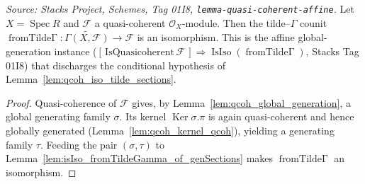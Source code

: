 \begin{lemma}
  \label{lem:isIso_fromTildeGamma_of_quasicoherent}
  \textit{Source: Stacks Project, Schemes, Tag 01I8,
  \texttt{lemma-quasi-coherent-affine}.}
  Let \(X = \operatorname{Spec} R\) and \(\mathcal{F}\) a quasi-coherent
  \(\mathcal{O}_X\)-module. Then the tilde--\(\Gamma\) counit
  \(\operatorname{fromTilde\Gamma} : \widetilde{\Gamma(X, \mathcal{F})} \to \mathcal{F}\)
  is an isomorphism. This is the affine global-generation instance
  (\([{\,}\mathrm{IsQuasicoherent}\,\mathcal{F}{\,}] \Rightarrow
  \operatorname{IsIso}(\operatorname{fromTilde\Gamma})\), Stacks Tag 01I8) that
  discharges the conditional hypothesis of Lemma~\ref{lem:qcoh_iso_tilde_sections}.
\end{lemma}
\begin{proof}
  Quasi-coherence of \(\mathcal{F}\) gives, by Lemma~\ref{lem:qcoh_global_generation}, a
  global generating family \(\sigma\). Its kernel \(\operatorname{Ker} \sigma.\pi\) is
  again quasi-coherent and hence globally generated
  (Lemma~\ref{lem:qcoh_kernel_qcoh}), yielding a generating family \(\tau\). Feeding the
  pair \((\sigma, \tau)\) to Lemma~\ref{lem:isIso_fromTildeGamma_of_genSections} makes
  \(\operatorname{fromTilde\Gamma}\) an isomorphism.
\end{proof}

